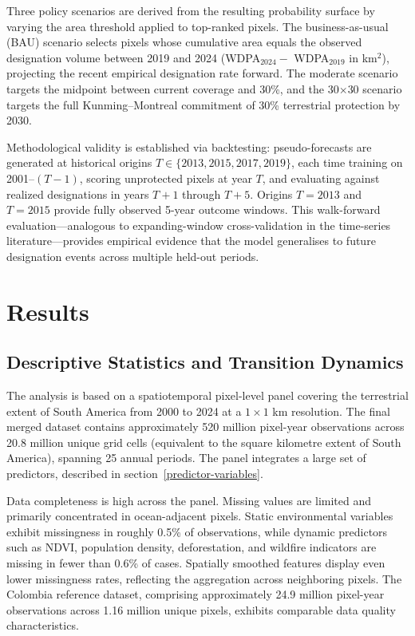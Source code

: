 \documentclass[12pt]{article}
\theoremstyle{break} %
\begin{document}
Three policy scenarios are derived from the resulting probability surface by varying the area threshold applied to top-ranked pixels. The business-as-usual (BAU) scenario selects pixels whose cumulative area equals the observed designation volume between 2019 and 2024 (WDPA$_{2024} -$ WDPA$_{2019}$ in km$^2$), projecting the recent empirical designation rate forward. The moderate scenario targets the midpoint between current coverage and 30\%, and the 30$\times$30 scenario targets the full Kunming--Montreal commitment of 30\% terrestrial protection by 2030.

Methodological validity is established via backtesting: pseudo-forecasts are generated at historical origins $T \in \{2013, 2015, 2017, 2019\}$, each time training on 2001--$(T-1)$, scoring unprotected pixels at year $T$, and evaluating against realized designations in years $T+1$ through $T+5$. Origins $T = 2013$ and $T = 2015$ provide fully observed 5-year outcome windows. This walk-forward evaluation---analogous to expanding-window cross-validation in the time-series literature---provides empirical evidence that the model generalises to future designation events across multiple held-out periods.


\section{Results}
\label{results}

\subsection{Descriptive Statistics and Transition Dynamics}
\label{results:descriptives}

The analysis is based on a spatiotemporal pixel-level panel covering the terrestrial extent of South America from 2000 to 2024 at a $1 \times 1$ km resolution. The final merged dataset contains approximately 520 million pixel-year observations across 20.8 million unique grid cells (equivalent to the square kilometre extent of South America), spanning 25 annual periods. The panel integrates a large set of predictors, described in section~\ref{predictor-variables}.

Data completeness is high across the panel. Missing values are limited and primarily concentrated in ocean-adjacent pixels. Static environmental variables exhibit missingness in roughly 0.5\% of observations, while dynamic predictors such as NDVI, population density, deforestation, and wildfire indicators are missing in fewer than 0.6\% of cases. Spatially smoothed features display even lower missingness rates, reflecting the aggregation across neighboring pixels. The Colombia reference dataset, comprising approximately 24.9 million pixel-year observations across 1.16 million unique pixels, exhibits comparable data quality characteristics.
\end{document}
